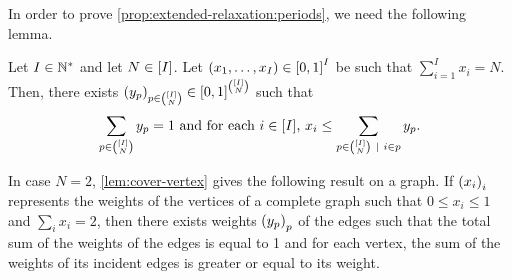 In order to prove \cref{prop:extended-relaxation:periods}, we need the following lemma.

\begin{lem}\label{lem:cover-vertex}
Let $I\in\mathbb{N}^*$ and let $N\in\range{I}$.
Let $\bracket{x_1,\ldots,x_I}\in\sqbracket{0,1}^I$ be such that $\sum_{i=1}^I x_i = N$.
Then, there exists $\bracket{y_p}_{p\in{\range{I}\choose N}}\in\sqbracket{0,1}^{\range{I}\choose N}$ such that
\begin{equation}
  \sum_{p\in{\range{I} \choose N}}y_p = 1
  \ \mbox{and for each $i\in\range{I}$,}\ 
  x_i \le \sum_{p\in{\range{I} \choose N}~|~i\in p}y_p.
\end{equation}
\end{lem}


\begin{rmq}
In case $N=2$, \cref{lem:cover-vertex} gives the following result on a graph.
If $\bracket{x_i}_i$ represents the weights of the vertices of a complete graph such that $0\le x_i\le1$ and $\sum_i x_i=2$,
then there exists weights $\bracket{y_p}_p$ of the edges such that the total sum of the weights of the edges is equal to 1 and for each vertex, the sum of the weights of its incident edges is greater or equal to its weight.
\end{rmq}



